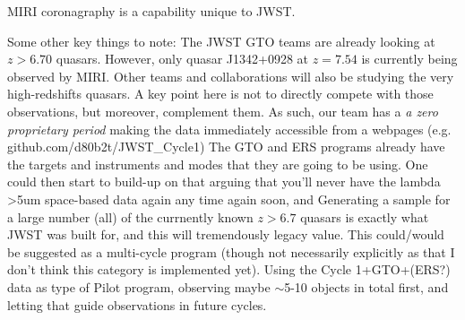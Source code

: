 \documentclass[12pt]{article}
\begin{document}
MIRI coronagraphy is a capability unique to JWST.

Some other key things to note:  
The JWST GTO teams are already looking at $z>6.70$ quasars. 
However, %
only quasar J1342+0928 at $z=7.54$ is currently being observed by MIRI. 
Other teams and collaborations will also be studying the very high-redshifts quasars. 
A key point here is not to directly compete with those observations, but moreover, complement them.
As such, our team has a {\it a zero  proprietary period} making the data immediately accessible from
a webpages (e.g. github.com/d80b2t/JWST\_Cycle1)
The GTO and ERS programs already have the targets and instruments and modes 
that they are going to be using. One could then start to build-up on that arguing that 
you’ll never have the lambda >5um space-based data again any time again soon, 
and
Generating a sample for a large number (all) of the currnently known $z>6.7$ quasars is exactly 
what JWST was built for, and this will tremendously legacy value. 
This could/would be suggested as a multi-cycle program (though not necessarily explicitly 
as that I don’t think this category is implemented yet). Using the Cycle 1+GTO+(ERS?) 
data as type of Pilot program, observing maybe $\sim$5-10 objects in total first, and letting 
that guide observations in future cycles. 

















%
%
\justifyobservations   %


\end{document}
